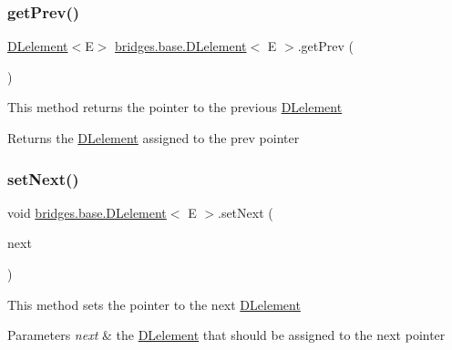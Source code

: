 \subsubsection{\texorpdfstring{get\+Prev()}{getPrev()}}
{\footnotesize\ttfamily \hyperlink{classbridges_1_1base_1_1_d_lelement}{D\+Lelement}$<$E$>$ \hyperlink{classbridges_1_1base_1_1_d_lelement}{bridges.\+base.\+D\+Lelement}$<$ E $>$.get\+Prev (\begin{DoxyParamCaption}{ }\end{DoxyParamCaption})}

This method returns the pointer to the previous \hyperlink{classbridges_1_1base_1_1_d_lelement}{D\+Lelement} \begin{DoxyReturn}{Returns}
the \hyperlink{classbridges_1_1base_1_1_d_lelement}{D\+Lelement} assigned to the prev pointer 
\end{DoxyReturn}
\hypertarget{classbridges_1_1base_1_1_d_lelement_a1dfea3f7b47901d539aefcba2cd900d9}{}\label{classbridges_1_1base_1_1_d_lelement_a1dfea3f7b47901d539aefcba2cd900d9} 
\subsubsection{\texorpdfstring{set\+Next()}{setNext()}}
{\footnotesize\ttfamily void \hyperlink{classbridges_1_1base_1_1_d_lelement}{bridges.\+base.\+D\+Lelement}$<$ E $>$.set\+Next (\begin{DoxyParamCaption}\item[{\hyperlink{classbridges_1_1base_1_1_d_lelement}{D\+Lelement}$<$ E $>$}]{next }\end{DoxyParamCaption})}

This method sets the pointer to the next \hyperlink{classbridges_1_1base_1_1_d_lelement}{D\+Lelement}


\begin{DoxyParams}{Parameters}
{\em next} & the \hyperlink{classbridges_1_1base_1_1_d_lelement}{D\+Lelement} that should be assigned to the next pointer \\
\hline
\end{DoxyParams}
\hypertarget{classbridges_1_1base_1_1_d_lelement_a60b1f5bdaf33ad1dfcc493ebc51939d1}{}\label{classbridges_1_1base_1_1_d_lelement_a60b1f5bdaf33ad1dfcc493ebc51939d1} 
